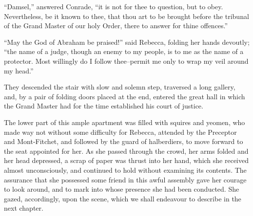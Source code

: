 ``Damsel,'' answered Conrade, ``it is not for thee to question, but to
obey. Nevertheless, be it known to thee, that thou art to be brought
before the tribunal of the Grand Master of our holy Order, there to
answer for thine offences.''

``May the God of Abraham be praised!'' said Rebecca, folding her hands
devoutly; ``the name of a judge, though an enemy to my people, is to me
as the name of a protector. Most willingly do I follow thee--permit me
only to wrap my veil around my head.''

They descended the stair with slow and solemn step, traversed a long
gallery, and, by a pair of folding doors placed at the end, entered the
great hall in which the Grand Master had for the time established his
court of justice.

The lower part of this ample apartment was filled with squires and
yeomen, who made way not without some difficulty for Rebecca, attended
by the Preceptor and Mont-Fitchet, and followed by the guard of
halberdiers, to move forward to the seat appointed for her. As she
passed through the crowd, her arms folded and her head depressed, a
scrap of paper was thrust into her hand, which she received almost
unconsciously, and continued to hold without examining its contents. The
assurance that she possessed some friend in this awful assembly gave her
courage to look around, and to mark into whose presence she had been
conducted. She gazed, accordingly, upon the scene, which we shall
endeavour to describe in the next chapter.
